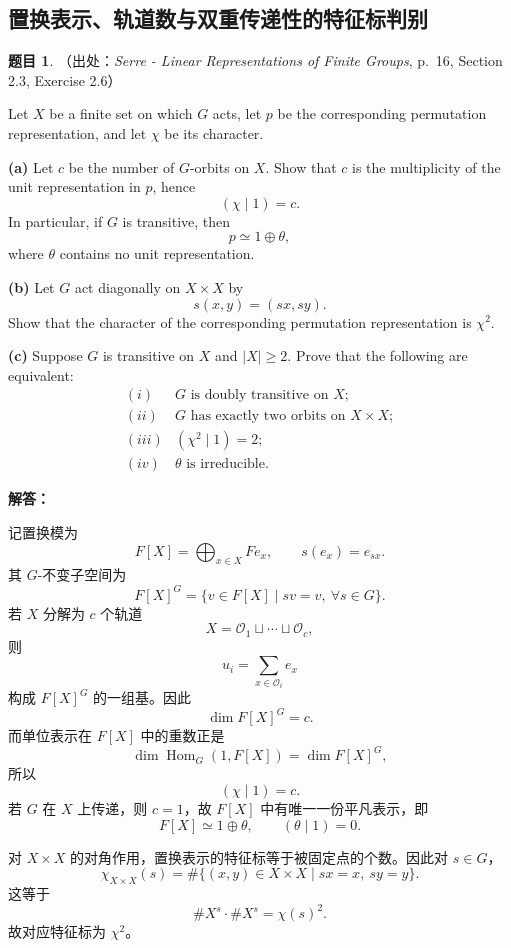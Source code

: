 \documentclass[a4paper]{ctexart}
\theoremstyle{definition}
\newtheorem{example}{题目}[section]
\theoremstyle{analysis}
\theoremstyle{plain}
\begin{document}
\subsection{置换表示、轨道数与双重传递性的特征标判别}
\label{subsec:problem-serre-permutation-double-transitive}

\begin{example}
（出处：\textit{Serre - Linear Representations of Finite Groups}, p.~16, Section 2.3, Exercise 2.6）

Let \(X\) be a finite set on which \(G\) acts, let \(p\) be the corresponding
permutation representation, and let \(\chi\) be its character.

\textbf{(a)} Let \(c\) be the number of \(G\)-orbits on \(X\). Show that \(c\)
is the multiplicity of the unit representation in \(p\), hence
\[
  (\chi\mid 1)=c.
\]
In particular, if \(G\) is transitive, then
\[
  p\simeq 1\oplus \theta,
\]
where \(\theta\) contains no unit representation.

\textbf{(b)} Let \(G\) act diagonally on \(X\times X\) by
\[
  s(x,y)=(sx,sy).
\]
Show that the character of the corresponding permutation representation is
\(\chi^2\).

\textbf{(c)} Suppose \(G\) is transitive on \(X\) and \(|X|\geq 2\). Prove that
the following are equivalent:
\[
\begin{array}{ll}
  (i) & G\text{ is doubly transitive on }X;\\
  (ii) & G\text{ has exactly two orbits on }X\times X;\\
  (iii) & (\chi^2\mid 1)=2;\\
  (iv) & \theta\text{ is irreducible.}
\end{array}
\]

\textbf{解答：}

记置换模为
\[
  F[X]=\bigoplus_{x\in X}Fe_x,
  \qquad
  s(e_x)=e_{sx}.
\]
其 \(G\)-不变子空间为
\[
  F[X]^G=\{v\in F[X]\mid sv=v,\ \forall s\in G\}.
\]
若 \(X\) 分解为 \(c\) 个轨道
\[
  X=\mathcal O_1\sqcup\cdots\sqcup\mathcal O_c,
\]
则
\[
  u_i=\sum_{x\in \mathcal O_i}e_x
\]
构成 \(F[X]^G\) 的一组基。因此
\[
  \dim F[X]^G=c.
\]
而单位表示在 \(F[X]\) 中的重数正是
\[
  \dim\operatorname{Hom}_G(1,F[X])
  =
  \dim F[X]^G,
\]
所以
\[
  (\chi\mid 1)=c.
\]
若 \(G\) 在 \(X\) 上传递，则 \(c=1\)，故 \(F[X]\) 中有唯一一份平凡表示，即
\[
  F[X]\simeq 1\oplus\theta,
  \qquad
  (\theta\mid 1)=0.
\]

对 \(X\times X\) 的对角作用，置换表示的特征标等于被固定点的个数。因此对 \(s\in G\)，
\[
  \chi_{X\times X}(s)
  =
  \#\{(x,y)\in X\times X\mid sx=x,\ sy=y\}.
\]
这等于
\[
  \#X^s\cdot \#X^s=\chi(s)^2.
\]
故对应特征标为 \(\chi^2\)。


\end{example}
\end{document}
